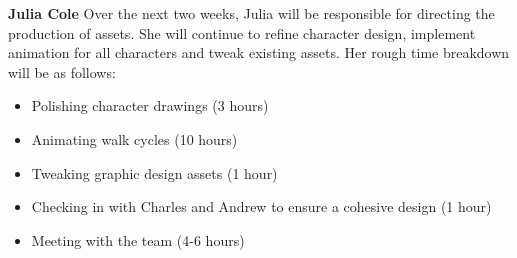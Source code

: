 \documentclass[]{article}
\begin{document}
\noindent
\textbf{Julia Cole}
Over the next two weeks, Julia will be responsible for directing the
production of assets. She will continue to refine character design,
implement animation for all characters and tweak existing assets.
Her rough time breakdown will be as follows:
\begin{itemize}
\item Polishing character drawings (3 hours)
\item Animating walk cycles (10 hours)
\item Tweaking graphic design assets (1 hour)
\item Checking in with Charles and Andrew to ensure a cohesive design (1 hour)
\item Meeting with the team (4-6 hours)
\end{itemize}
\end{document}

